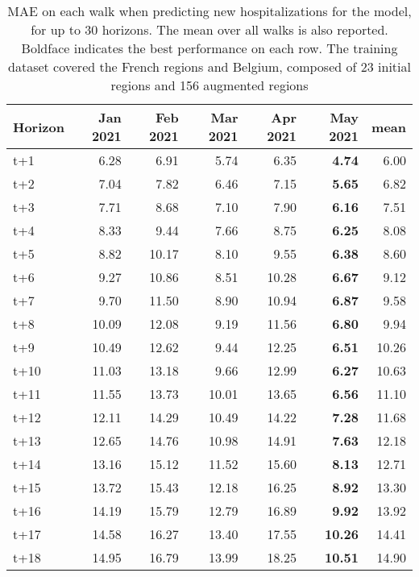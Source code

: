 \begin{table}[H]
\centering
\caption{MAE on each walk when predicting new hospitalizations for the model, for up to 30 horizons. The mean over all walks is also reported. Boldface indicates the best performance on each row. The training dataset covered the French regions and Belgium, composed of 23 initial regions and 156 augmented regions }
\label{tab:MAE_walk_assembly_1}
\begin{tabular}{lrrrrrr}
\toprule
Horizon &  Jan 2021 &  Feb 2021 &  Mar 2021 &  Apr 2021 &  May 2021 &  mean \\
\midrule
t+1  & 6.28  & 6.91  & 5.74  & 6.35  & \textbf{4.74}  & 6.00  \\
t+2  & 7.04  & 7.82  & 6.46  & 7.15  & \textbf{5.65}  & 6.82  \\
t+3  & 7.71  & 8.68  & 7.10  & 7.90  & \textbf{6.16}  & 7.51  \\
t+4  & 8.33  & 9.44  & 7.66  & 8.75  & \textbf{6.25}  & 8.08  \\
t+5  & 8.82  & 10.17  & 8.10  & 9.55  & \textbf{6.38}  & 8.60  \\
t+6  & 9.27  & 10.86  & 8.51  & 10.28  & \textbf{6.67}  & 9.12  \\
t+7  & 9.70  & 11.50  & 8.90  & 10.94  & \textbf{6.87}  & 9.58  \\
t+8  & 10.09  & 12.08  & 9.19  & 11.56  & \textbf{6.80}  & 9.94  \\
t+9  & 10.49  & 12.62  & 9.44  & 12.25  & \textbf{6.51}  & 10.26  \\
t+10  & 11.03  & 13.18  & 9.66  & 12.99  & \textbf{6.27}  & 10.63  \\
t+11  & 11.55  & 13.73  & 10.01  & 13.65  & \textbf{6.56}  & 11.10  \\
t+12  & 12.11  & 14.29  & 10.49  & 14.22  & \textbf{7.28}  & 11.68  \\
t+13  & 12.65  & 14.76  & 10.98  & 14.91  & \textbf{7.63}  & 12.18  \\
t+14  & 13.16  & 15.12  & 11.52  & 15.60  & \textbf{8.13}  & 12.71  \\
t+15  & 13.72  & 15.43  & 12.18  & 16.25  & \textbf{8.92}  & 13.30  \\
t+16  & 14.19  & 15.79  & 12.79  & 16.89  & \textbf{9.92}  & 13.92  \\
t+17  & 14.58  & 16.27  & 13.40  & 17.55  & \textbf{10.26}  & 14.41  \\
t+18  & 14.95  & 16.79  & 13.99  & 18.25  & \textbf{10.51}  & 14.90  \\

\end{tabular}
\end{table}
